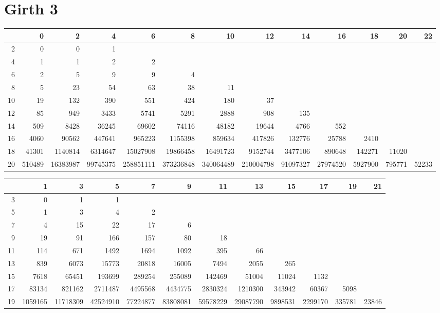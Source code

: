 \section*{Girth 3}
\begin{table}\centering\tiny
\begin{tabular}{r|rrrrrrrrrrrr}
& 0 & 2 & 4 & 6 & 8 & 10 & 12 & 14 & 16 & 18 & 20 & 22 \\
\hline
2 & 0 & 0 & 1 &  &  &  &  &  &  &  &  & \\
4 & 1 & 1 & 2 & 2 &  &  &  &  &  &  &  & \\
6 & 2 & 5 & 9 & 9 & 4 &  &  &  &  &  &  & \\
8 & 5 & 23 & 54 & 63 & 38 & 11 &  &  &  &  &  & \\
10 & 19 & 132 & 390 & 551 & 424 & 180 & 37 &  &  &  &  & \\
12 & 85 & 949 & 3433 & 5741 & 5291 & 2888 & 908 & 135 &  &  &  & \\
14 & 509 & 8428 & 36245 & 69602 & 74116 & 48182 & 19644 & 4766 & 552 &  &  & \\
16 & 4060 & 90562 & 447641 & 965223 & 1155398 & 859634 & 417826 & 132776 & 25788 & 2410 &  & \\
18 & 41301 & 1140814 & 6314647 & 15027908 & 19866458 & 16491723 & 9152744 & 3477106 & 890648 & 142271 & 11020 & \\
20 & 510489 & 16383987 & 99745375 & 258851111 & 373236848 & 340064489 & 210004798 & 91097327 & 27974520 & 5927900 & 795771 & 52233
\end{tabular}

\begin{tabular}{r|rrrrrrrrrrr}
& 1 & 3 & 5 & 7 & 9 & 11 & 13 & 15 & 17 & 19 & 21 \\
\hline
3 & 0 & 1 & 1 &  &  &  &  &  &  &  &  \\
5 & 1 & 3 & 4 & 2 &  &  &  &  &  &  &  \\
7 & 4 & 15 & 22 & 17 & 6 &  &  &  &  &  &  \\
9 & 19 & 91 & 166 & 157 & 80 & 18 &  &  &  &  &  \\
11 & 114 & 671 & 1492 & 1694 & 1092 & 395 & 66 &  &  &  &  \\
13 & 839 & 6073 & 15773 & 20818 & 16005 & 7494 & 2055 & 265 &  &  &  \\
15 & 7618 & 65451 & 193699 & 289254 & 255089 & 142469 & 51004 & 11024 & 1132 &  &  \\
17 & 83134 & 821162 & 2711487 & 4495568 & 4434775 & 2830324 & 1210300 & 343942 & 60367 & 5098 &  \\
19 & 1059165 & 11718309 & 42524910 & 77224877 & 83808081 & 59578229 & 29087790 & 9898531 & 2299170 & 335781 & 23846
\end{tabular}\end{table}

